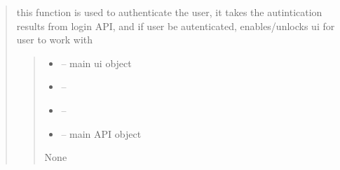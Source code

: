 \documentclass[letterpaper,10pt,english]{sphinxmanual}
\begin{document}
\begin{quote}
\begin{savenotes}\begin{fulllineitems}
\label{\detokenize{setting/backend/user_login_logout_funcs:oxin.backend.user_login_logout_funcs.authenticate_user}}
\pysigstartsignatures
{}
\pysigstopsignatures
\sphinxAtStartPar
this function is used to authenticate the user,
it takes the autintication results from login API, and if user be autenticated, enables/unlocks ui for user to work with
\begin{quote}\begin{description}
\begin{itemize}
\item {} 
\sphinxAtStartPar
{} – main ui object

\item {} 
\sphinxAtStartPar
{} – 

\item {} 
\sphinxAtStartPar
{} – 

\item {} 
\sphinxAtStartPar
{} – main API object

\end{itemize}

\sphinxAtStartPar
None

\end{description}\end{quote}

\end{fulllineitems}\end{savenotes}



\end{quote}
\end{document}
